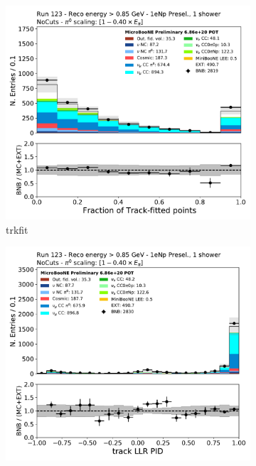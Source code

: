 \begin{figure}[H]
    \centering
    \begin{subfigure}{0.3\textwidth}
    \includegraphics[width=1.0\textwidth]{Sidebands/Figures/1eNp/HighEnergy/HiEext_NPOneShr_None_pi0e040/trkfit.pdf}
    \caption{trkfit}
    \end{subfigure}
    \begin{subfigure}{0.3\textwidth}
    \includegraphics[width=1.0\textwidth]{Sidebands/Figures/1eNp/HighEnergy/HiEext_NPOneShr_None_pi0e040/trkpid.pdf}

\end{subfigure}
\end{figure}

